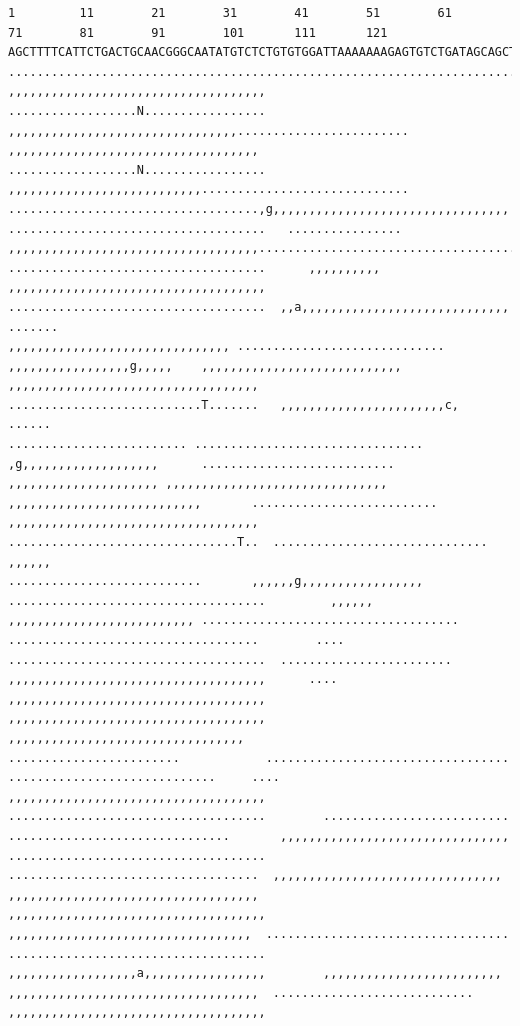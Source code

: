 \documentclass[
  letterpaper,
  DIV=11,
  numbers=noendperiod]{scrreprt}
\begin{document}
\begin{verbatim}
1         11        21        31        41        51        61        71        81        91        101       111       121
AGCTTTTCATTCTGACTGCAACGGGCAATATGTCTCTGTGTGGATTAAAAAAAGAGTGTCTGATAGCAGCTTCTGAACTGGTTACCTGCCGTGAGTAAATTAAAATTTTATTGACTTAGGTCACTAAATAC
..................................................................................................................................
,,,,,,,,,,,,,,,,,,,,,,,,,,,,,,,,,,,, ..................N................. ,,,,,,,,,,,,,,,,,,,,,,,,,,,,,,,,........................
,,,,,,,,,,,,,,,,,,,,,,,,,,,,,,,,,,, ..................N................. ,,,,,,,,,,,,,,,,,,,,,,,,,,,.............................
...................................,g,,,,,,,,,,,,,,,,,,,,,,,,,,,,,,,,,  ....................................   ................
,,,,,,,,,,,,,,,,,,,,,,,,,,,,,,,,,,,....................................   ....................................      ,,,,,,,,,,
,,,,,,,,,,,,,,,,,,,,,,,,,,,,,,,,,,,,  ....................................  ,,a,,,,,,,,,,,,,,,,,,,,,,,,,,,,,     .......
,,,,,,,,,,,,,,,,,,,,,,,,,,,,,,, .............................  ,,,,,,,,,,,,,,,,,g,,,,,    ,,,,,,,,,,,,,,,,,,,,,,,,,,,,
,,,,,,,,,,,,,,,,,,,,,,,,,,,,,,,,,,,  ...........................T.......   ,,,,,,,,,,,,,,,,,,,,,,,c,          ......
......................... ................................   ,g,,,,,,,,,,,,,,,,,,,      ...........................
,,,,,,,,,,,,,,,,,,,,, ,,,,,,,,,,,,,,,,,,,,,,,,,,,,,,, ,,,,,,,,,,,,,,,,,,,,,,,,,,,       ..........................
,,,,,,,,,,,,,,,,,,,,,,,,,,,,,,,,,,,   ................................T..  ..............................   ,,,,,,
...........................       ,,,,,,g,,,,,,,,,,,,,,,,,   ....................................         ,,,,,,
,,,,,,,,,,,,,,,,,,,,,,,,,, ....................................  ...................................        ....
....................................  ........................  ,,,,,,,,,,,,,,,,,,,,,,,,,,,,,,,,,,,,      ....
,,,,,,,,,,,,,,,,,,,,,,,,,,,,,,,,,,,,   ,,,,,,,,,,,,,,,,,,,,,,,,,,,,,,,,,,,,  ,,,,,,,,,,,,,,,,,,,,,,,,,,,,,,,,,
........................            .................................. .............................     ....
,,,,,,,,,,,,,,,,,,,,,,,,,,,,,,,,,,,,   ....................................        ..........................
...............................       ,,,,,,,,,,,,,,,,,,,,,,,,,,,,,,,, ....................................
...................................  ,,,,,,,,,,,,,,,,,,,,,,,,,,,,,,,,  ,,,,,,,,,,,,,,,,,,,,,,,,,,,,,,,,,,,
,,,,,,,,,,,,,,,,,,,,,,,,,,,,,,,,,,,, ,,,,,,,,,,,,,,,,,,,,,,,,,,,,,,,,,,  ..................................
.................................... ,,,,,,,,,,,,,,,,,,a,,,,,,,,,,,,,,,,,        ,,,,,,,,,,,,,,,,,,,,,,,,,
,,,,,,,,,,,,,,,,,,,,,,,,,,,,,,,,,,,  ............................ ,,,,,,,,,,,,,,,,,,,,,,,,,,,,,,,,,,,,
\end{verbatim}
\end{document}

